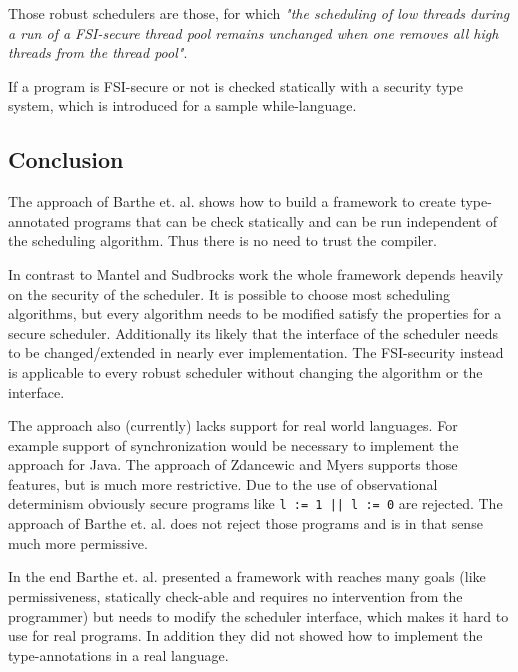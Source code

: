 \documentclass[a4paper,10pt]{llncs}
\begin{document}
Those robust schedulers are those, for which \textit{"the scheduling of low threads during a run of a FSI-secure
thread pool remains unchanged when one removes all high threads from the thread pool"}\cite{Mantel10}.

If a program is FSI-secure or not is checked statically with a security type system, which is introduced
for a sample while-language.

\subsection{Conclusion}
The approach of Barthe et. al. shows how to build a framework to create type-annotated programs that can
be check statically and can be run independent of the scheduling algorithm. Thus there is no need to trust
the compiler.

In contrast to Mantel and Sudbrocks work the whole framework depends heavily on the security of the scheduler.
It is possible to choose most scheduling algorithms, but every algorithm needs to be modified satisfy the
properties for a secure scheduler. Additionally its likely that the interface of the scheduler needs to be
changed/extended in nearly ever implementation. The FSI-security instead is applicable to every robust
scheduler without changing the algorithm or the interface.

The approach also (currently) lacks support for real world languages. For example support of synchronization
would be necessary to implement the approach for Java. The approach of Zdancewic and Myers supports those
features, but is much more restrictive. Due to the use of observational determinism obviously secure programs
like \texttt{l := 1 || l := 0} are rejected. The approach of Barthe et. al. does not reject those programs and
is in that sense much more permissive.

In the end Barthe et. al. presented a framework with reaches many goals (like permissiveness, statically check-able
and requires no intervention from the programmer) but needs to modify the scheduler interface, which makes it
hard to use for real programs. In addition they did not showed how to implement the type-annotations in a real
language.

\newpage

\end{document}
